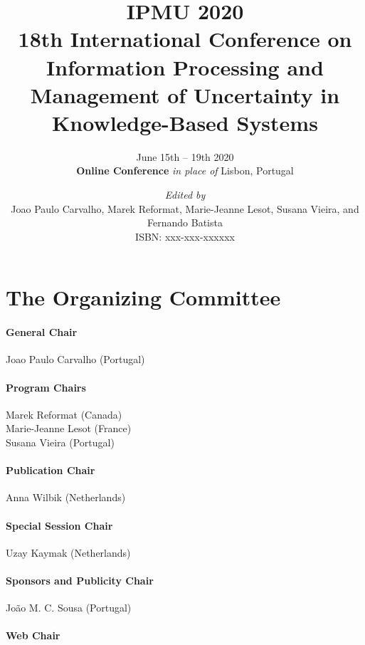 \documentclass[11pt, twoside, b5paper]{extbook}
\title{\sffamily \textbf{IPMU 2020} \\[1ex]
18th International Conference on Information Processing and Management of Uncertainty in Knowledge-Based Systems}
\author{June 15th – 19th 2020\\[1ex]
{\bf Online Conference} {\em in place of} Lisbon, Portugal}
\date{
{\em Edited by}\\
\vspace{1em}
Joao Paulo Carvalho,
Marek Reformat, 
Marie-Jeanne Lesot,
Susana Vieira,
and Fernando Batista\\
\vspace{1em}
ISBN: xxx-xxx-xxxxxx
}
\begin{document}


\clearpage

\frontmatter
\maketitle


\begin{small}
\tableofcontents
\end{small}

\chapter*{The Organizing Committee}

\subsubsection*{General Chair}

Joao Paulo Carvalho (Portugal)

\subsubsection*{Program Chairs}

Marek Reformat (Canada)\\
Marie-Jeanne Lesot (France)\\
Susana Vieira (Portugal)

\subsubsection*{Publication Chair}

Anna Wilbik (Netherlands)

\subsubsection*{Special Session Chair}

Uzay Kaymak (Netherlands)

\subsubsection*{Sponsors and Publicity Chair}

João M. C. Sousa (Portugal)

\subsubsection*{Web Chair}
\end{document}
